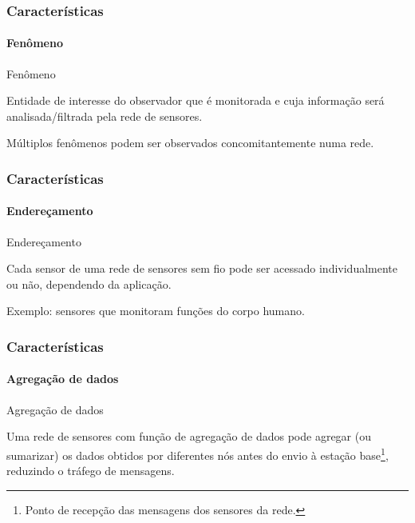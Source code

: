 \documentclass[notes]{beamer}
\begin{document}
\begin{frame}
\label{slide_15}
\frametitle{Características}
\framesubtitle{Fenômeno}

\begin{block}{Fenômeno}

Entidade de interesse do observador que é monitorada e cuja
informação será analisada/filtrada pela rede de sensores.
\end{block} \pause

\begin{block}

Múltiplos fenômenos podem ser observados concomitantemente numa rede.

\end{block}

\end{frame}

\begin{frame}
\label{slide_16}
\frametitle{Características}
\framesubtitle{Endereçamento}

\begin{block}{Endereçamento}

Cada sensor de uma rede de sensores sem fio pode ser acessado individualmente ou não, dependendo da aplicação. 

\end{block} \pause

\begin{exampleblock}

Exemplo: sensores que monitoram funções do corpo humano.

\end{exampleblock}


\end{frame}

\begin{frame}
\label{slide_17}
\frametitle{Características}
\framesubtitle{Agregação de dados}

\begin{block}{Agregação de dados}

Uma rede de sensores com função de agregação de dados pode agregar (ou sumarizar) os dados obtidos por diferentes nós antes do envio à estação base\footnote{Ponto de recepção das mensagens dos sensores da rede.}, reduzindo o tráfego de mensagens.

\end{block}

\end{frame}
\end{document}
